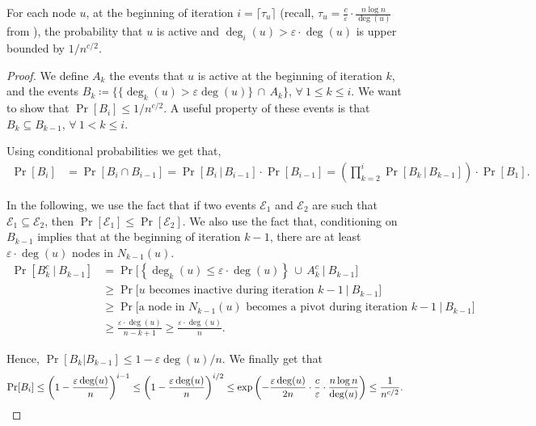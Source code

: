 \documentclass{theoretics}
\newcommand{\eps}{\ensuremath{\varepsilon}}
\begin{document}
 \begin{lemma} \label{lemma: low-deg-bound}
     For each node $u$, at the beginning of iteration $i = \lceil\tau_u\rceil$ (recall, $\tau_u = \frac{c}{\eps} \cdot \frac{n \log n}{\deg(u)}$ from ), the probability that $u$ is active and $\deg_{i}(u) > \eps \cdot \deg(u)$ is upper bounded by $1/n^{c/2}$.
 \end{lemma}
 \begin{proof}
We define $A_k$ the events that $u$ is active at the beginning of iteration $k$, and the events $B_k \coloneqq \{\{\deg_k(u)>\eps \deg(u)\} \, \cap \, A_k\}$, $\forall\ 1 \le k \le i$. 
We want to show that $\Pr[B_i]\leq 1/n^{c/2}$. A useful property of these events is that $B_k \subseteq B_{k-1}$, $\forall\ 1 < k \le i$.

Using conditional probabilities we get that,
\begin{align*}
    \Pr[B_i] &= \Pr[B_i \cap B_{i-1}] = \Pr[B_i\,|\, B_{i-1}]\cdot \Pr[B_{i-1}] = \left(\prod_{k=2}^i\Pr[B_k\,|\,B_{k-1}] \right)\cdot \Pr[B_1].
\end{align*}


In the following, we use the fact that if two events $\mathcal{E}_1$ and $\mathcal{E}_2$ are such that $\mathcal{E}_1\subseteq \mathcal{E}_2$, then $\Pr[\mathcal{E}_1]\leq \Pr[\mathcal{E}_2]$. 
We also use the fact that, conditioning on $B_{k-1}$ implies that at the beginning of iteration $k-1$, there are at least $\eps \cdot \deg(u)$ nodes in $N_{k-1}(u)$. 
\begin{align*}
    \Pr[B_k^c \ |\  B_{k-1}] &= \Pr\Big[\left\{\deg_k(u) \leq \eps\cdot \deg(u)\right\}\, \cup \, A_k^c \ | \ B_{k-1}\Big]\\
    & \geq \Pr\Big[\text{$u$ becomes inactive during iteration $k-1$} \  | \  B_{k-1}\Big]\\
    & \geq \Pr\Big[\text{a node in $N_{k-1}(u)$ becomes a pivot during iteration $k-1$} \  | \  B_{k-1}\Big]\\
    &\geq \frac{\eps\cdot \deg(u)}{n-k+1}\geq \frac{\eps\cdot \deg(u)}{n}.
\end{align*}



Hence, $\Pr[B_k|B_{k-1}]\leq 1-\eps\deg(u)/n$. 
We finally get that 
\begin{align*}
    \Pr[B_i] &\leq \left(1-\frac{\eps\deg(u)}{n}\right)^{i-1} \leq \left(1-\frac{\eps\deg(u)}{n}\right)^{i/2} 
    \leq \exp\left(-\frac{\eps\deg(u)}{2n}\cdot {\frac{c}{\eps}\cdot \frac{n\log n}{\deg(u)}} \right)\leq \frac{1}{n^{c/2}} . \qedhere
\end{align*}%
\end{proof}
\end{document}
